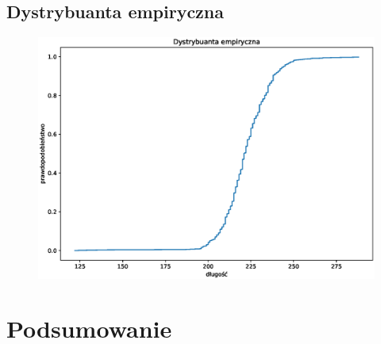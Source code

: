 \documentclass{article}
\theoremstyle{break}
\begin{document}
	\subsection{Dystrybuanta empiryczna}
	\begin{figure}[H]
		\includegraphics[scale=0.75]{DYSTRYBUANTA.eps}
	\end{figure}
	
	\section{Podsumowanie}
	
	
\end{document}
